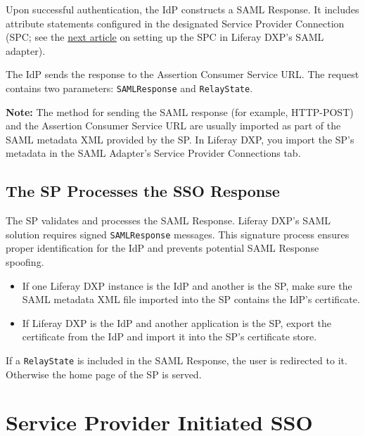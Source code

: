 Upon successful authentication, the IdP constructs a SAML Response. It
includes attribute statements configured in the designated Service
Provider Connection (SPC; see the
\href{/docs/7-2/deploy/-/knowledge_base/d/setting-up-liferay-as-a-saml-identity-provider}{next
article} on setting up the SPC in Liferay DXP's SAML adapter).

The IdP sends the response to the Assertion Consumer Service URL. The
request contains two parameters: \texttt{SAMLResponse} and
\texttt{RelayState}.

\noindent\hrulefill

\textbf{Note:} The method for sending the SAML response (for example,
HTTP-POST) and the Assertion Consumer Service URL are usually imported
as part of the SAML metadata XML provided by the SP. In Liferay DXP, you
import the SP's metadata in the SAML Adapter's Service Provider
Connections tab.

\noindent\hrulefill

\subsection{The SP Processes the SSO
Response}\label{the-sp-processes-the-sso-response}

The SP validates and processes the SAML Response. Liferay DXP's SAML
solution requires signed \texttt{SAMLResponse} messages. This signature
process ensures proper identification for the IdP and prevents potential
SAML Response spoofing.

\begin{itemize}
\tightlist
\item
  If one Liferay DXP instance is the IdP and another is the SP, make
  sure the SAML metadata XML file imported into the SP contains the
  IdP's certificate.
\item
  If Liferay DXP is the IdP and another application is the SP, export
  the certificate from the IdP and import it into the SP's certificate
  store.
\end{itemize}

If a \texttt{RelayState} is included in the SAML Response, the user is
redirected to it. Otherwise the home page of the SP is served.

\section{Service Provider Initiated
SSO}\label{service-provider-initiated-sso}

